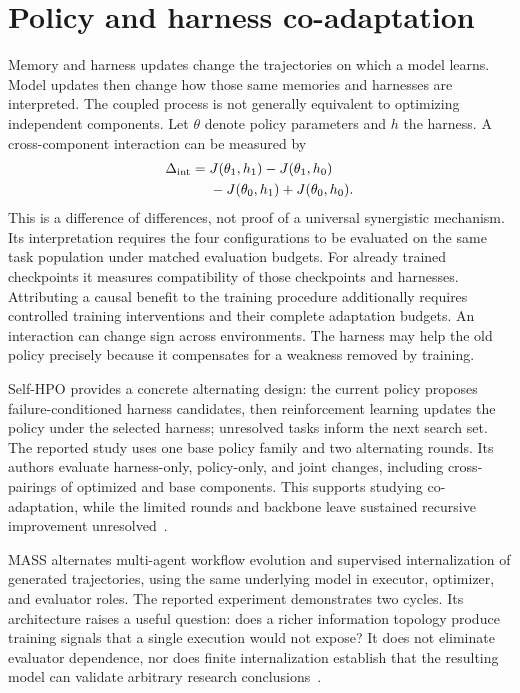 \section{Policy and harness co-adaptation}\label{sec:C30:04}
Memory and harness updates change the trajectories on which a model learns. Model updates then change how those same memories and harnesses are interpreted. The coupled process is not generally equivalent to optimizing independent components. Let $\theta$ denote policy parameters and $h$ the harness. A cross-component interaction can be measured by
\begin{equation}
\begin{aligned}
 \Delta_{\rm int}={}&J(\theta_1,h_1)-J(\theta_1,h_0)\\
 &-J(\theta_0,h_1)+J(\theta_0,h_0).
\end{aligned}
\end{equation}
This is a difference of differences, not proof of a universal synergistic mechanism. Its interpretation requires the four configurations to be evaluated on the same task population under matched evaluation budgets. For already trained checkpoints it measures compatibility of those checkpoints and harnesses. Attributing a causal benefit to the training procedure additionally requires controlled training interventions and their complete adaptation budgets. An interaction can change sign across environments. The harness may help the old policy precisely because it compensates for a weakness removed by training.

Self-HPO provides a concrete alternating design: the current policy proposes failure-conditioned harness candidates, then reinforcement learning updates the policy under the selected harness; unresolved tasks inform the next search set. The reported study uses one base policy family and two alternating rounds. Its authors evaluate harness-only, policy-only, and joint changes, including cross-pairings of optimized and base components. This supports studying co-adaptation, while the limited rounds and backbone leave sustained recursive improvement unresolved~\cite{root_selfhpo2026}.

MASS alternates multi-agent workflow evolution and supervised internalization of generated trajectories, using the same underlying model in executor, optimizer, and evaluator roles. The reported experiment demonstrates two cycles. Its architecture raises a useful question: does a richer information topology produce training signals that a single execution would not expose? It does not eliminate evaluator dependence, nor does finite internalization establish that the resulting model can validate arbitrary research conclusions~\cite{root_mass2026}.

